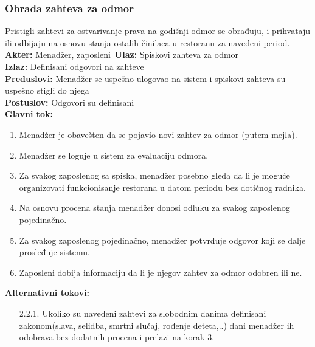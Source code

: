 \documentclass{article}
\begin{document}
\subsubsection{Obrada zahteva za odmor}
Pristigli zahtevi za ostvarivanje prava na godišnji odmor se obrađuju, i prihvataju ili odbijaju na osnovu stanja ostalih činilaca u restoranu za navedeni period.\\
\textbf{Akter:} Menadžer, zaposleni\
\textbf{Ulaz:} Spiskovi zahteva za odmor\\
\textbf{Izlaz:} Definisani odgovori na zahteve\\
\textbf{Preduslovi:} Menadžer se uspešno ulogovao na sistem i spiskovi zahteva su uspešno stigli do njega\\
\textbf{Postuslov:} Odgovori su definisani\\
\textbf{Glavni tok:}
\begin{enumerate}
\item Menadžer je obavešten da se pojavio novi zahtev za odmor (putem mejla).
\item Menadžer se loguje u sistem za evaluaciju odmora.
\item Za svakog zaposlenog sa spiska, menadžer posebno gleda da li je moguće organizovati funkcionisanje restorana u datom periodu bez dotičnog radnika.
\item Na osnovu procena stanja menadžer donosi odluku za svakog zaposlenog pojedinačno.
\item Za svakog zaposlenog pojedinačno, menadžer potvrđuje odgovor koji se dalje prosleđuje sistemu.
\item Zaposleni dobija informaciju da li je njegov zahtev za odmor odobren ili ne.
\end{enumerate}
\textbf{Alternativni tokovi:}\\
\begin{itemize}
\item[2.2.1.] Ukoliko su navedeni zahtevi za slobodnim danima definisani zakonom(slava, selidba, smrtni slučaj, rođenje deteta,..) dani menadžer ih odobrava bez dodatnih procena i prelazi na korak 3.
\end{itemize}
\end{document}
